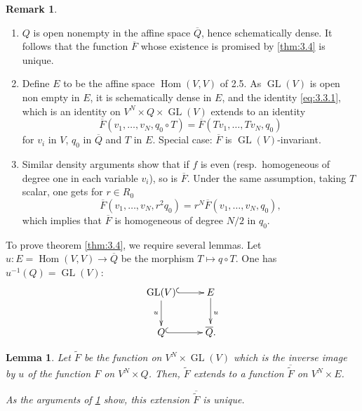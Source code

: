\documentclass[11pt,a4paper]{article}
\theoremstyle{plain}
\newtheorem{lemma}[theorem]{Lemma}
\theoremstyle{definition}
\newtheorem{remark}[theorem]{Remark}
\DeclareMathOperator{\Hom}{Hom}
\DeclareMathOperator{\GL}{GL}
\begin{document}
\begin{remark}~\label{rem:3.5}
\begin{enumerate}[label=(\roman*)]
\item $Q$ is open nonempty in the affine space $\overline{Q}$, hence schematically dense. It follows that the function $\overline{F}$ whose existence is promised by \ref{thm:3.4} is unique.

\item Define $E$ to be the affine space $\Hom(V,V)$ of 2.5. As $\GL(V)$ is open non empty in $E$, it is schematically dense in $E$, and the identity \eqref{eq:3.3.1}, which is an identity on $V^N \times Q \times \GL(V)$ extends to an identity
\begin{equation}\label{eq:3.5.1}
\overline{F}(v_1,\dots,v_N, q_0 \circ T) = \overline{F}(Tv_1,\dots,Tv_N, q_0)
\end{equation}
for $v_i$ in $V$, $q_0$ in $\overline{Q}$ and $T$ in $E$. Special case: $\overline{F}$ is $\GL(V)$-invariant.

\item Similar density arguments show that if $f$ is even (resp.\ homogeneous of degree one in each variable $v_i$), so is $\overline{F}$. Under the same assumption, taking $T$ scalar, one gets for $r \in R_0$
\[
\overline{F}(v_1,\dots,v_N, r^2 q_0) = r^N \overline{F}(v_1,\dots,v_N, q_0),
\]
which implies that $\overline{F}$ is homogeneous of degree $N/2$ in $q_0$.
\end{enumerate}
\end{remark}

To prove theorem \ref{thm:3.4}, we require several lemmas. Let $u : E = \Hom(V,V) \to \overline{Q}$ be the morphism $T \mapsto q \circ T$. One has $u^{-1}(Q) = \GL(V)$:
\begin{equation}\label{eq:3.5.2}
\xymatrix{
\GL(V) \ar@{^{(}->}[r] \ar[d]_{u} & E \ar[d]^{u} \\
Q \ar@{^{(}->}[r] & \overline{Q}.
}
\end{equation}

\begin{lemma}\label{lem:3.6}
Let $\widetilde{F}$ be the function on $V^N \times \GL(V)$ which is the inverse image by $u$ of the function $F$ on $V^N \times Q$. Then, $\widetilde{F}$ extends to a function $\overline{\widetilde{F}}$ on $V^N \times E$.

As the arguments of \ref{rem:3.5} show, this extension $\overline{\widetilde{F}}$ is unique.
\end{lemma}
\end{document}
